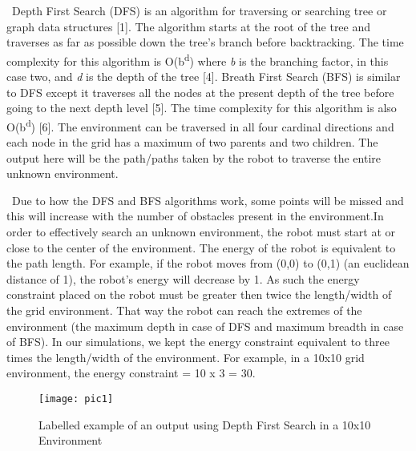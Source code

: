 \documentclass[conference]{IEEEtran}
\begin{document}
\
Depth First Search (DFS) is an algorithm for traversing or searching tree or graph data structures [1]. The algorithm starts at the root of the tree and traverses as far as possible down the tree's branch before backtracking. The time complexity for this algorithm is O(b\textsuperscript{d}) where \textit{b} is the branching factor, in this case two, and \textit{d} is the depth of the tree [4]. Breath First Search (BFS) is similar to DFS except it traverses all the nodes at the present depth of the tree before going to the next depth level [5]. The time complexity for this algorithm is also O(b\textsuperscript{d}) [6]. The environment can be traversed in all four cardinal directions and each node in the grid has a maximum of two parents and two children. The output here will be the path/paths taken by the robot to traverse the entire unknown environment.

\
Due to how the DFS and BFS algorithms work, some points will be missed and this will increase with the number of obstacles present in the environment.In order to effectively search an unknown environment, the robot must start at or close to the center of the environment. The energy of the robot is equivalent to the path length. For example, if the robot moves from (0,0) to (0,1) (an euclidean distance of 1), the robot's energy will decrease by 1. As such the energy constraint placed on the robot must be greater then twice the length/width of the grid environment. That way the robot can reach the extremes of the environment (the maximum depth in case of DFS and maximum breadth in case of BFS). In our simulations, we kept the energy constraint equivalent to three times the length/width of the environment. For example, in a 10x10 grid environment, the energy constraint = 10 x 3 = 30.

\begin{figure}[htp]
    \centering
    \texttt{[image: pic1]}
    \caption{Labelled example of an output using Depth First Search in a 10x10 Environment}
    \label{fig:pic1}
\end{figure}
\end{document}
